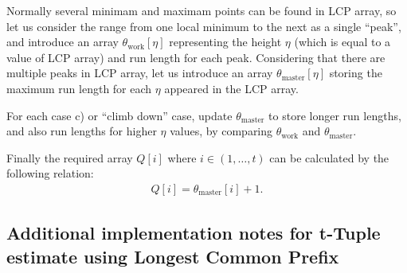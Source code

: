 ﻿\documentclass[a3paper,xelatex,english]{bxjsarticle}
\begin{document}
Normally several minimam and maximam points can be found in LCP array, 
so let us consider the range from one local minimum to the next as a single ``peak'', and introduce an array $\theta_{\textrm{work}}[\eta]$ representing the height $\eta$ (which is equal to a value of LCP array) and run length for each peak.
Considering that there are multiple peaks in LCP array, let us introduce an array $\theta_{\textrm{master}}[\eta]$ storing the maximum run length for each $\eta$ appeared in the LCP array.

For each case c) or ``climb down'' case, update $\theta_{\textrm{master}}$ to store longer run lengths, and also run lengths for higher $\eta$ values, by comparing $\theta_{\textrm{work}}$ and $\theta_{\textrm{master}}$.

Finally the required array $Q[i]$ where $i \in (1, \ldots, t)$ can be calculated by the following relation:
\begin{align}
Q[i] = \theta_{\textrm{master}}[i] + 1.
\end{align}

\clearpage
\subsection{Additional implementation notes for t-Tuple estimate using Longest Common Prefix}
\end{document}

